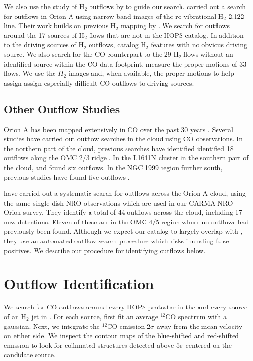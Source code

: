 \documentclass[twocolumn]{aastex63}
\newcommand{\co}[1][]{\ensuremath{^{#1}}CO}
\begin{document}
We also use the study of H$_2$ outflows by \citet{Davis09} to guide our search. \citet{Davis09} carried out a search for outflows in Orion A using narrow-band images of the ro-vibrational H$_2$ 2.122 \micron{} line. Their work builds on previous H$_2$ mapping by \citet{Stanke02}. We search for outflows around the 17 sources of H$_2$ flows that are not in the HOPS catalog. In addition to the driving sources of H$_2$ outflows, \citet{Davis09} catalog H$_2$ features with no obvious driving source. We also search for the CO counterpart to the 29 H$_2$ flows without an identified source within the CO data footprint. \citet{Davis09} measure the proper motions of 33 flows. We use the $H_2$ images and, when available, the proper motions to help assign assign especially difficult CO outflows to driving sources.

\subsection{Other Outflow Studies}
Orion A has been mapped extensively in CO over the past 30 years \citep[e.g.][]{Bally87,Wilson05,Shimajiri11,Buckle12,Ripple13,Berne14}. Several studies have carried out outflow searches in the cloud using CO observations. In the northern part of the cloud, previous searches have identified identified 18 outflows along the OMC 2/3 ridge \citep{Chini97,Aso00,Williams03,Takahashi08,Shimajiri08,Shimajiri09}. In the L1641N cluster in the southern part of the cloud, \citet{Stanke07} and \citet{Nakamura12} found six outflows. In the NGC 1999 region further south, previous studies have found five outflows \citep{Morgan91,Moro-Martin99,Davis2000,Choi17}. 

\citet{Tanabe:submitted} have carried out a systematic search for outflows across the Orion A cloud, using the same single-dish NRO observations which are used in our CARMA-NRO Orion survey. They identify a total of 44 outflows across the cloud, including 17 new detections. Eleven of these are in the OMC 4/5 region where no outflows had previously been found. Although we expect our catalog to largely overlap with \citet{Tanabe:submitted}, they use an automated outflow search procedure which risks including false positives. We describe our procedure for identifying outflows below.

\section{Outflow Identification}
\label{sec:identification}
We search for CO outflows around every HOPS protostar in the \citet{Furlan16} and every source of an H$_2$ jet in \citet{Davis09}. For each source, first fit an average \co[12] spectrum with a gaussian. Next, we integrate the \co[12] emission 2$\sigma$ away from the mean velocity on either side. We inspect the contour maps of the blue-shifted and red-shifted emission to look for collimated structures detected above $5\sigma$ centered on the candidate source.
\end{document}
